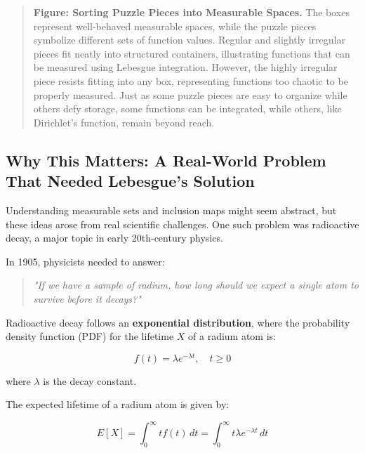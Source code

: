 \begin{quote}
\textbf{Figure: Sorting Puzzle Pieces into Measurable Spaces.}  
The boxes represent well-behaved measurable spaces, while the puzzle pieces symbolize different sets of function values. Regular and slightly irregular pieces fit neatly into structured containers, illustrating functions that can be measured using Lebesgue integration. However, the highly irregular piece resists fitting into any box, representing functions too chaotic to be properly measured. Just as some puzzle pieces are easy to organize while others defy storage, some functions can be integrated, while others, like Dirichlet’s function, remain beyond reach.
\end{quote}


\subsection{Why This Matters: A Real-World Problem That Needed Lebesgue’s Solution}

Understanding measurable sets and inclusion maps might seem abstract, but these ideas arose from real scientific challenges. One such problem was radioactive decay, a major topic in early 20th-century physics. 

In 1905, physicists needed to answer:

\begin{quote}
\textit{"If we have a sample of radium, how long should we expect a single atom to survive before it decays?"}
\end{quote}

Radioactive decay follows an \textbf{exponential distribution}, where the probability density function (PDF) for the lifetime \( X \) of a radium atom is:

\[
f(t) = \lambda e^{-\lambda t}, \quad t \geq 0
\]

where \( \lambda \) is the decay constant.

The expected lifetime of a radium atom is given by:

\[
E[X] = \int_0^\infty t f(t) \, dt = \int_0^\infty t \lambda e^{-\lambda t} \, dt
\]

